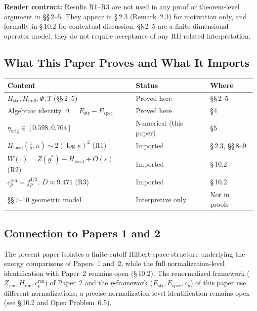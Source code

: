 \documentclass[11pt]{article}
\newcommand{\Hstr}{H_{\mathrm{str}}}
\newcommand{\Hnull}{H_{\mathrm{null}}}
\newcommand{\Estr}{E_{\mathrm{str}}}
\newcommand{\Espec}{E_{\mathrm{spec}}}
\newcommand{\etaorig}{\eta_{\mathrm{orig}}}
\newcommand{\Hlocal}{H_{\mathrm{local}}}
\newcommand{\Hren}{H_{\mathrm{ren}}}
\newcommand{\cren}{c_p^{\mathrm{ren}}}
\begin{document}
\textbf{Reader contract:} Results R1--R3 are not used in any proof or
theorem-level argument in \S\S\,2--5. They appear in \S\,2.3 (Remark~2.3)
for motivation only, and formally in \S\,10.2 for contextual discussion.
\S\S\,2--5 are a finite-dimensional operator model; they do not require
acceptance of any RH-related interpretation.

\subsection{What This Paper Proves and What It Imports}

\begin{center}
\begin{tabular}{lll}
\toprule
Content & Status & Where \\
\midrule
$\Hstr, \Hnull, \Phi, T$ (\S\S\,2--5) & Proved here & \S\S\,2--5 \\
Algebraic identity $\Delta=\Estr-\Espec$ & Proved here & \S4 \\
$\etaorig\in[0.598,0.704]$ & Numerical (this paper) & \S5 \\
$\Hlocal(\tfrac12,\kappa)\sim 2(\log\kappa)^2$ (R1) & Imported \cite{Paper1} & \S\,2.3, \S\S\,8--9 \\ %
$W(\cdot)=Z(g^*)-\Hlocal+O(\varepsilon)$ (R2) & Imported \cite{Paper2} & \S\,10.2 \\
$\cren=f_p^{1/2}$, $D\approx 9.471$ (R3) & Imported \cite{Paper2} & \S\,10.2 \\
\S\S\,7--10 geometric model & Interpretive only & Not in proofs \\
\bottomrule
\end{tabular}
\end{center}

\subsection{Connection to Papers 1 and 2}

The present paper isolates a finite-cutoff Hilbert-space structure underlying
the energy comparisons of Papers~1 and~2, while the full normalization-level
identification with Paper~2 remains open (\S\,10.2). The renormalized
framework ($Z_{\mathrm{ren}}, \Hren, \cren$) of Paper~2 and the
$\eta$-framework ($\Estr, \Espec, c_p$) of this paper use different
normalizations; a precise normalization-level identification remains open
(see \S\,10.2 and Open Problem~6.5).
\end{document}
